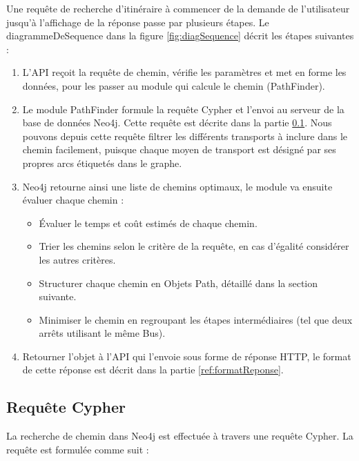 Une requête de recherche d'itinéraire à commencer de la demande de l'utilisateur jusqu'à l'affichage de la réponse passe par plusieurs étapes. Le \gls{diagrammeDeSequence} dans la figure \ref{fig:diagSequence} décrit les étapes suivantes :
\begin{enumerate}
	\item L'API reçoit la requête de chemin, vérifie les paramètres et met en forme les données, pour les passer au module qui calcule le chemin (PathFinder).
	\item Le module PathFinder formule la requête Cypher et l'envoi au serveur de la base de données Neo4j. Cette requête est décrite dans la partie \ref{section:cypher}.
	      Nous pouvons depuis cette requête filtrer les différents transports à inclure dans le chemin facilement, puisque chaque moyen de transport est désigné par ses propres arcs étiquetés dans le graphe.
	\item Neo4j retourne ainsi une liste de chemins optimaux, le module va ensuite évaluer chaque chemin :
	      \begin{itemize}
	      	\item Évaluer le temps et coût estimés de chaque chemin.
	      	\item Trier les chemins selon le critère de la requête, en cas d'égalité considérer les autres critères.
	      	\item Structurer chaque chemin en Objets Path, détaillé dans la section suivante.
	      	\item Minimiser le chemin en regroupant les étapes intermédiaires (tel que deux arrêts utilisant le même Bus).
	      \end{itemize}
	\item Retourner l'objet à l'API qui l'envoie sous forme de réponse HTTP, le format de cette réponse est décrit dans la partie \ref{ref:formatReponse}.
\end{enumerate}
\label{SectionPathFinding}
	
\subsection{Requête Cypher}
\label{section:cypher}

La recherche de chemin dans Neo4j est effectuée à travers une requête Cypher. La requête est formulée comme suit :

